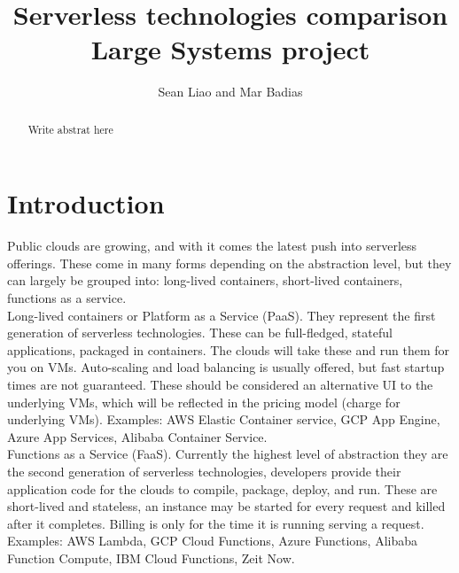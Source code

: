 \documentclass[11pt]{article}
\title{
  Serverless technologies comparison\\
  \large Large Systems project}
\author{Sean Liao and Mar Badias}
\begin{document}
\maketitle




\begin{abstract}
Write abstrat here
\end{abstract}



\section{Introduction}
\label{introduction}
Public clouds are growing, and with it comes the latest push into serverless offerings. These come in many forms depending on the abstraction level, but they can largely be grouped into: long-lived containers, short-lived containers, functions as a service. \\

Long-lived containers or Platform as a Service (PaaS). They represent the first generation of serverless technologies. These can be full-fledged, stateful applications, packaged in containers. The clouds will take these and run them for you on VMs. Auto-scaling and load balancing is usually offered, but fast startup times are not guaranteed. These should be considered an alternative UI to the underlying VMs, which will be reflected in the pricing model (charge for underlying VMs). Examples: AWS Elastic Container service, GCP App Engine, Azure App Services, Alibaba Container Service. \\

Functions as a Service (FaaS). Currently the highest level of abstraction they are the second generation of serverless technologies, developers provide their application code for the clouds to compile, package, deploy, and run. These are short-lived and stateless, an instance may be started for every request and killed after it completes. Billing is only for the time it is running serving a request. Examples: AWS Lambda, GCP Cloud Functions, Azure Functions, Alibaba Function Compute, IBM Cloud Functions, Zeit Now.\\
\end{document}
